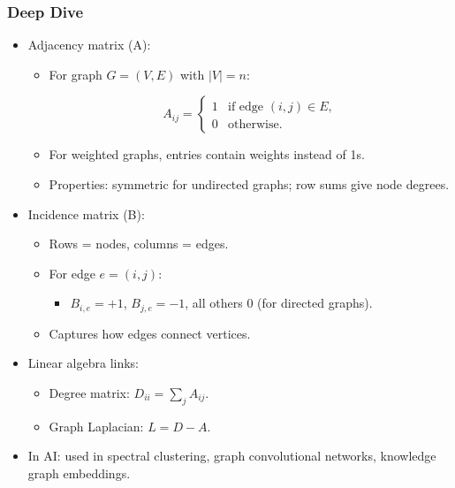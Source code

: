 \documentclass[
  letterpaper,
  DIV=11,
  numbers=noendperiod]{scrreprt}
\providecommand{\tightlist}{%
  \setlength{\itemsep}{0pt}\setlength{\parskip}{0pt}}
\begin{document}
\subsubsection{Deep Dive}\label{deep-dive-171}

\begin{itemize}
\item
  Adjacency matrix (A):

  \begin{itemize}
  \item
    For graph \(G=(V,E)\) with \(|V|=n\):

    \[
    A_{ij} = \begin{cases} 
      1 & \text{if edge } (i,j) \in E, \\
      0 & \text{otherwise.}
    \end{cases}
    \]
  \item
    For weighted graphs, entries contain weights instead of 1s.
  \item
    Properties: symmetric for undirected graphs; row sums give node
    degrees.
  \end{itemize}
\item
  Incidence matrix (B):

  \begin{itemize}
  \item
    Rows = nodes, columns = edges.
  \item
    For edge \(e=(i,j)\):

    \begin{itemize}
    \tightlist
    \item
      \(B_{i,e} = +1\), \(B_{j,e} = -1\), all others 0 (for directed
      graphs).
    \end{itemize}
  \item
    Captures how edges connect vertices.
  \end{itemize}
\item
  Linear algebra links:

  \begin{itemize}
  \tightlist
  \item
    Degree matrix: \(D_{ii} = \sum_j A_{ij}\).
  \item
    Graph Laplacian: \(L = D - A\).
  \end{itemize}
\item
  In AI: used in spectral clustering, graph convolutional networks,
  knowledge graph embeddings.
\end{itemize}
\end{document}
